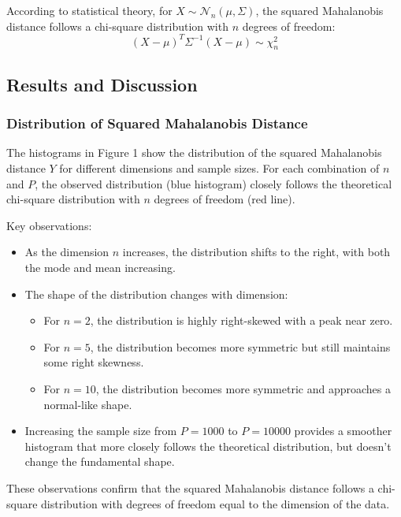 \documentclass[12pt]{article}
\begin{document}
According to statistical theory, for $X \sim \mathcal{N}_n(\mu, \Sigma)$, the squared Mahalanobis distance follows a chi-square distribution with $n$ degrees of freedom:
\begin{equation}
    (X - \mu)^T \Sigma^{-1} (X - \mu) \sim \chi^2_n
\end{equation}

\subsection{Results and Discussion}

\subsubsection{Distribution of Squared Mahalanobis Distance}

The histograms in Figure 1 show the distribution of the squared Mahalanobis distance $Y$ for different dimensions and sample sizes. For each combination of $n$ and $P$, the observed distribution (blue histogram) closely follows the theoretical chi-square distribution with $n$ degrees of freedom (red line).

Key observations:
\begin{itemize}
    \item As the dimension $n$ increases, the distribution shifts to the right, with both the mode and mean increasing.
    \item The shape of the distribution changes with dimension:
    \begin{itemize}
        \item For $n=2$, the distribution is highly right-skewed with a peak near zero.
        \item For $n=5$, the distribution becomes more symmetric but still maintains some right skewness.
        \item For $n=10$, the distribution becomes more symmetric and approaches a normal-like shape.
    \end{itemize}
    \item Increasing the sample size from $P=1000$ to $P=10000$ provides a smoother histogram that more closely follows the theoretical distribution, but doesn't change the fundamental shape.
\end{itemize}

These observations confirm that the squared Mahalanobis distance follows a chi-square distribution with degrees of freedom equal to the dimension of the data.
\end{document}
